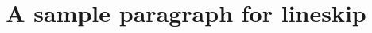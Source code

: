 \documentclass{article}
\title{A sample paragraph for lineskip}
\begin{document}
	\testpar %
\end{document}
